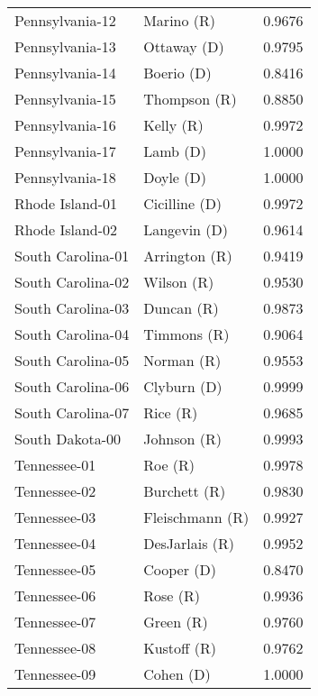\begin{longtable}{llr}
   Pennsylvania-12 &           Marino (R) &       0.9676 \\
   Pennsylvania-13 &          Ottaway (D) &       0.9795 \\
   Pennsylvania-14 &           Boerio (D) &       0.8416 \\
   Pennsylvania-15 &         Thompson (R) &       0.8850 \\
   Pennsylvania-16 &            Kelly (R) &       0.9972 \\
   Pennsylvania-17 &             Lamb (D) &       1.0000 \\
   Pennsylvania-18 &            Doyle (D) &       1.0000 \\
   Rhode Island-01 &        Cicilline (D) &       0.9972 \\
   Rhode Island-02 &         Langevin (D) &       0.9614 \\
 South Carolina-01 &        Arrington (R) &       0.9419 \\
 South Carolina-02 &           Wilson (R) &       0.9530 \\
 South Carolina-03 &           Duncan (R) &       0.9873 \\
 South Carolina-04 &          Timmons (R) &       0.9064 \\
 South Carolina-05 &           Norman (R) &       0.9553 \\
 South Carolina-06 &          Clyburn (D) &       0.9999 \\
 South Carolina-07 &             Rice (R) &       0.9685 \\
   South Dakota-00 &          Johnson (R) &       0.9993 \\
      Tennessee-01 &              Roe (R) &       0.9978 \\
      Tennessee-02 &         Burchett (R) &       0.9830 \\
      Tennessee-03 &      Fleischmann (R) &       0.9927 \\
      Tennessee-04 &       DesJarlais (R) &       0.9952 \\
      Tennessee-05 &           Cooper (D) &       0.8470 \\
      Tennessee-06 &             Rose (R) &       0.9936 \\
      Tennessee-07 &            Green (R) &       0.9760 \\
      Tennessee-08 &          Kustoff (R) &       0.9762 \\
      Tennessee-09 &            Cohen (D) &       1.0000 \\

\end{longtable}

